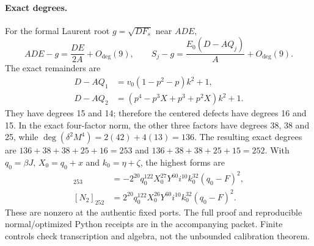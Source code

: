 \paragraph{Exact degrees.}
For the formal Laurent root $g=\sqrt{DF_s}$ near $ADE$,
\[
ADE-g=\frac{DE}{2A}+O_{\deg}(9),\qquad
S_j-g=\frac{E_0(D-AQ_j)}{A}+O_{\deg}(9).
\]
The exact remainders are
\begin{align*}
D-AQ_1&=v_0(1-p^2-p)k^2+1,\\
D-AQ_2&=(p^4-p^3X+p^3+p^2X)k^2+1.
\end{align*}
They have degrees 15 and 14; therefore the centered defects have
degrees 16 and 15. In the exact four-factor norm, the other three
factors have degrees 38, 38 and 25, while
$\deg(\delta^2M^4)=2(42)+4(13)=136$. The resulting exact degrees
are $136+38+38+25+16=253$ and $136+38+38+25+15=252$.
With $q_0=\beta J$, $X_0=q_0+x$ and $k_0=\eta+\zeta$, the highest
forms are
\begin{align*}
[N_1]_{253}&=-2^{20}q_0^{122}X_0^{27}Y^{60}i^{10}k_0^{32}(q_0-F)^2,\\
[N_2]_{252}&= 2^{20}q_0^{122}X_0^{26}Y^{60}i^{10}k_0^{32}(q_0-F)^2.
\end{align*}
These are nonzero at the authentic fixed ports. The full proof and
reproducible normal/optimized Python receipts are in the accompanying
packet. Finite controls check transcription and algebra, not the
unbounded calibration theorem.
